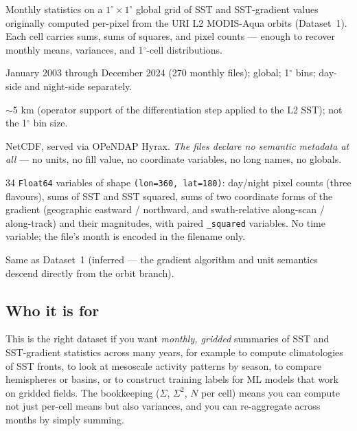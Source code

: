 \documentclass[11pt]{article}
\begin{document}
\begin{description}[leftmargin=2em,style=nextline,topsep=2pt]
  \item[What it is.]
    Monthly statistics on a $1^\circ \times 1^\circ$ global grid of
    SST and SST-gradient values originally computed per-pixel from
    the URI L2 MODIS-Aqua orbits (Dataset~1). Each cell carries
    sums, sums of squares, and pixel counts --- enough to recover
    monthly means, variances, and 1$^\circ$-cell distributions.
  \item[Coverage.]
    January 2003 through December 2024 (270 monthly files);
    global; 1$^\circ$ bins; day-side and night-side separately.
  \item[Spatial scale of the underlying gradient.]
    $\sim$5 km (operator support of the differentiation step
    applied to the L2 SST); not the 1$^\circ$ bin size.
  \item[Format.] NetCDF, served via OPeNDAP Hyrax. \emph{The
    files declare no semantic metadata at all} --- no units, no
    fill value, no coordinate variables, no long names, no globals.
  \item[What you get per file.] 34 \texttt{Float64} variables of
    shape \texttt{(lon=360, lat=180)}: day/night pixel counts (three
    flavours), sums of SST and SST squared, sums of two coordinate
    forms of the gradient (geographic eastward / northward, and
    swath-relative along-scan / along-track) and their magnitudes,
    with paired \texttt{\_squared} variables. No time variable; the
    file's month is encoded in the filename only.
  \item[Producer.]
    Same as Dataset~1 (inferred --- the gradient algorithm and unit
    semantics descend directly from the orbit branch).
\end{description}

\subsection{Who it is for}

This is the right dataset if you want \emph{monthly, gridded}
summaries of SST and SST-gradient statistics across many years,
for example to compute climatologies of SST fronts, to look at
mesoscale activity patterns by season, to compare hemispheres or
basins, or to construct training labels for ML models that work
on gridded fields. The bookkeeping ($\Sigma$, $\Sigma^2$, $N$ per
cell) means you can compute not just per-cell means but also
variances, and you can re-aggregate across months by simply
summing.
\end{document}

